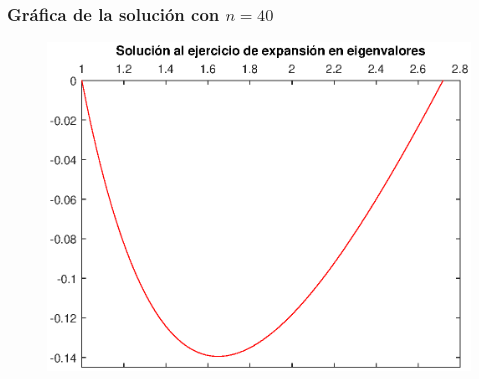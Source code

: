 \documentclass[12pt]{beamer}
\begin{document}
\begin{frame}
\frametitle{Gráfica de la  solución con $n=40$}
\begin{figure}[H]
    \centering
    \includegraphics[scale=0.64]{Imagenes/Expansion_Eigenfunciones_02.eps}
\end{figure}
\end{frame}

\end{document}
